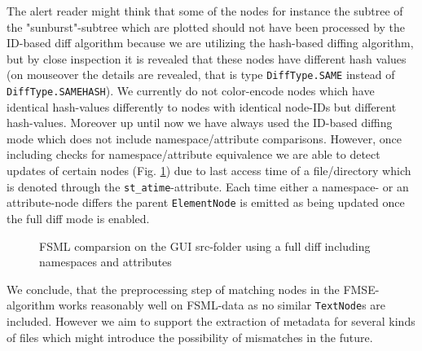 The alert reader might think that some of the nodes for instance the subtree of the "sunburst"-subtree which are plotted should not have been processed by the ID-based diff algorithm because we are utilizing the hash-based diffing algorithm, but by close inspection it is revealed that these nodes have different hash values (on mouseover the details are revealed, that is type \texttt{DiffType.SAME} instead of \texttt{DiffType.SAMEHASH}). We currently do not color-encode nodes which have identical hash-values differently to nodes with identical node-IDs but different hash-values. Moreover up until now we have always used the ID-based diffing mode which does not include namespace/attribute comparisons. However, once including checks for namespace/attribute equivalence we are able to detect updates of certain nodes (Fig. \ref{fig:fsml-gui-fulldiff}) due to last access time of a file/directory which is denoted through the \texttt{st\_atime}-attribute. Each time either a namespace- or an attribute-node differs the parent \texttt{ElementNode} is emitted as being updated once the full diff mode is enabled.

\begin{figure}[tb]
\caption{\label{fig:fsml-gui-fulldiff} FSML comparsion on the GUI src-folder using a full diff including namespaces and attributes}
\end{figure}

We conclude, that the preprocessing step of matching nodes in the FMSE-algorithm works reasonably well on FSML-data as no similar \texttt{TextNode}s are included. However we aim to support the extraction of metadata for several kinds of files which might introduce the possibility of mismatches in the future.

